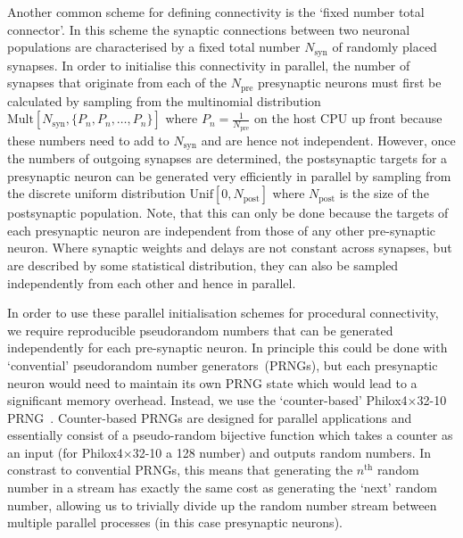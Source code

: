\documentclass[9pt,twocolumn,twoside,lineno]{pnas-new}
\newcommand{\todo}[1]{\textbf{\textsc{\textcolor{red}{(TODO: #1)}}}}
\begin{document}
Another common scheme for defining connectivity is the `fixed number total connector'.
In this scheme the synaptic connections between two neuronal populations are characterised by a fixed total number $N_{\text{syn}}$ of randomly placed synapses.
In order to initialise this connectivity in parallel, the number of synapses that originate from each of the $N_{\text{pre}}$ presynaptic neurons must first be calculated by sampling from the multinomial distribution $\text{Mult}[N_{\text{syn}}, \{P_{n}, P_{n}, \ldots, P_{n}\}]$ where $P_{n} = \frac{1}{N_{\text{pre}}}$ on the host CPU up front because these numbers need to add to $N_{\text{syn}}$ and are hence not independent.
However, once the numbers of outgoing synapses are determined, the postsynaptic targets for a presynaptic neuron can be generated very efficiently in parallel by sampling from the discrete uniform distribution $\text{Unif}[0, N_{\text{post}}]$ where $N_{\text{post}}$ is the size of the postsynaptic population.
Note, that this can only be done because the targets of each presynaptic neuron are independent from those of any other pre-synaptic neuron.
Where synaptic weights and delays are not constant across synapses, but are described by some statistical distribution, they can also be sampled independently from each other and hence in parallel.
%

In order to use these parallel initialisation schemes for procedural connectivity, we require reproducible pseudorandom numbers that can be generated independently for each pre-synaptic neuron.
In principle this could be done with `convential' pseudorandom  number generators~(PRNGs), but each presynaptic neuron would need to maintain its own PRNG state which would lead to a significant memory overhead.
Instead, we use the `counter-based' Philox4$\times$32-10 PRNG~\citep{Salmon2011}.
Counter-based PRNGs are designed for parallel applications and essentially consist of a pseudo-random bijective function which takes a counter as an input (for Philox4$\times$32-10 a \SI{128}{\bit} number) and outputs random numbers.
In constrast to convential PRNGs, this means that generating the $n^\text{th}$ random number in a stream has exactly the same cost as generating the `next' random number, allowing us to trivially divide up the random number stream between multiple parallel processes (in this case presynaptic neurons).
\end{document}
